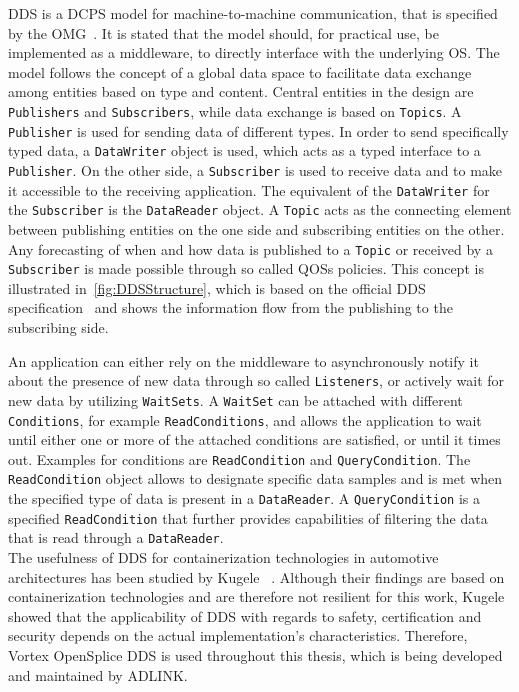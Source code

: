 \Gls*{DDS} is a \gls*{DCPS} model for machine-to-machine communication, that is specified by the \gls*{OMG}~\cite{omgDDSspec}.
It is stated that the model should, for practical use, be implemented as a middleware, to directly interface with the underlying \gls*{OS}.
The model follows the concept of a global data space to facilitate data exchange among entities based on type and content.
Central entities in the design are \texttt{Publishers} and \texttt{Subscribers}, while data exchange is based on \texttt{Topics}.
A \texttt{Publisher} is used for sending data of different types.
In order to send specifically typed data, a \texttt{DataWriter} object is used, which acts as a typed interface to a \texttt{Publisher}.
On the other side, a \texttt{Subscriber} is used to receive data and to make it accessible to the receiving application.
The equivalent of the \texttt{DataWriter} for the \texttt{Subscriber} is the \texttt{DataReader} object.
A \texttt{Topic} acts as the connecting element between publishing entities on the one side and subscribing entities on the other.
Any forecasting of when and how data is published to a \texttt{Topic} or received by a \texttt{Subscriber} is made possible through so called \glspl*{QOS} policies.
This concept is illustrated in~\autoref{fig:DDSStructure}, which is based on the official \gls*{DDS} specification~\cite{omgDDSspec} and shows the information flow from the publishing to the subscribing side.

An application can either rely on the middleware to asynchronously notify it about the presence of new data through so called \texttt{Listeners}, or actively wait for new data by utilizing \texttt{WaitSets}.
A \texttt{WaitSet} can be attached with different \texttt{Conditions}, for example \texttt{ReadConditions}, and allows the application to wait until either one or more of the attached conditions are satisfied, or until it times out.
Examples for conditions are \texttt{ReadCondition} and \texttt{QueryCondition}.
The \texttt{ReadCondition} object allows to designate specific data samples and is met when the specified type of data is present in a \texttt{DataReader}.
A \texttt{QueryCondition} is a specified \texttt{ReadCondition} that further provides capabilities of filtering the data that is read through a \texttt{DataReader}.
\\

The usefulness of \gls*{DDS} for containerization technologies in automotive architectures has been studied by Kugele \etal~\cite{KugeleDataCentricForAuto}.
Although their findings are based on containerization technologies and are therefore not resilient for this work, Kugele \etal showed that the applicability of \gls*{DDS} with regards to safety, certification and security depends on the actual implementation's characteristics.
Therefore, Vortex OpenSplice DDS is used throughout this thesis, which is being developed and maintained by ADLINK.

